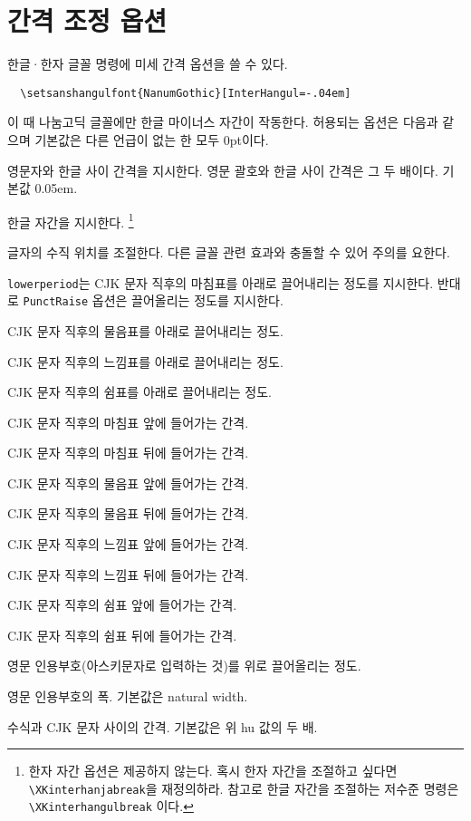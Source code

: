 \documentclass[a4paper]{article}
\def\cs#1{\texttt{\textbackslash #1}}
\def\hparen#1{{\small\hangulparens(#1)}}
\let\hparens\hparen
\begin{document}
\section{간격 조정 옵션}\label{sec:fontopts}
 한글·한자 글꼴 명령에 미세 간격 옵션을
쓸 수 있다.
\begin{verbatim}
  \setsanshangulfont{NanumGothic}[InterHangul=-.04em]
\end{verbatim}
이 때 나눔고딕 글꼴에만 한글 마이너스 자간이 작동한다.
허용되는 옵션은 다음과 같으며 기본값은 다른 언급이 없는 한 모두 0pt이다.
\begin{description}\itemsep0pt
\item[hu, InterLatinCJK]
  영문자와 한글 사이 간격을 지시한다.
  영문 괄호와 한글 사이 간격은 그 두 배이다. 기본값 0.05em.
\item[interhchar, InterHangul]
  { 한글 자간을} 지시한다.%
  \footnote{한자 자간 옵션은 제공하지 않는다.
  혹시 한자 자간을 조절하고 싶다면 \cs{XKinterhanjabreak}을 재정의하라.
  참고로 한글 자간을 조절하는 저수준 명령은 \cs{XKinterhangulbreak} 이다.}
\item[charraise, CharRaise]
  글자의 {수직 위치}를 조절한다.
  다른 글꼴 관련 효과와 충돌할 수 있어 주의를 요한다.
\item[lowerperiod, PunctRaise]
  \verb+lowerperiod+는 CJK 문자 직후의 마침표를 아래로 끌어내리는
  {정도를 지시한다.
  반대로 \verb+PunctRaise+ 옵션은 끌어올리는 정도를 지시한다.}
\item[lowerquestion]
  CJK 문자 직후의 물음표를 아래로 끌어내리는 정도.
\item[lowerexclamation]
  CJK 문자 직후의 느낌표를 아래로 끌어내리는 정도.
\item[lowercomma]
  CJK 문자 직후의 쉼표를 아래로 끌어내리는 정도.
\item[preperiodkern]
  {CJK 문자 직후의 마침표 앞에
  들어가는 간격.}
\item[postperiodkern]
  {CJK 문자 직후의 마침표 뒤에
  들어가는 간격.}
\item[prequestionkern]
  CJK 문자 직후의 물음표 앞에 들어가는 간격.
\item[postquestionkern]
  CJK 문자 직후의 물음표 뒤에 들어가는 간격.
\item[preexclamationkern]
  CJK 문자 직후의 느낌표 앞에 들어가는 간격.
\item[postexclamationkern]
  CJK 문자 직후의 느낌표 뒤에 들어가는 간격.
\item[precommakern]
  CJK 문자 직후의 쉼표 앞에 들어가는 간격.
\item[postcommakern]
  CJK 문자 직후의 쉼표 뒤에 들어가는 간격.
\item[quoteraise]
  영문 인용부호\hparens{아스키문자로 입력하는 것}를
  위로 끌어올리는 정도.
\item[quotewidth]
  영문 인용부호의 폭. 기본값은 natural width.
\item[postmathskip]
  수식과 CJK 문자 사이의 간격.  기본값은 위 hu 값의 두 배.
\end{description}
\end{document}
